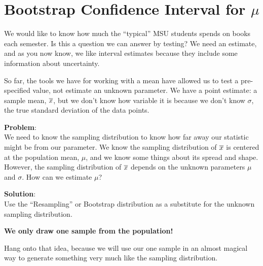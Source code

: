 \def\theTopic{Textbook Costs}
\def\dayNum{8 }

\section{Bootstrap  Confidence Interval for $\mu$}


We would like to know how much the ``typical'' MSU students spends on
books each semester.  Is this a question we can answer by testing?
  We need an estimate, and as you now know, we like interval
estimates because they include some information about uncertainty.

So far, the tools we have for working with a mean have allowed us to
test a pre-specified value, not estimate an unknown parameter.
We have a point estimate: a sample mean, $\overline{x}$, but we don't know how
variable it is because we don't know $\sigma$, the true standard
deviation of the data points. 

{\bf Problem}:\\
We need to know the sampling distribution to know how far away our
statistic might be from our parameter.  We know the sampling
distribution of $ \overline{x}$ is centered at the population mean, $\mu$, and
we know some things about its spread and shape.   However, the sampling
distribution  of $\overline{x}$ depends on the unknown parameters $\mu$ and $\sigma$. How
can we estimate $\mu$?  


{\bf Solution}:\\Use the ``Resampling'' or Bootstrap distribution as a
substitute for the unknown sampling distribution.
\vspace{-.2in}
\begin{center}
	{\bf\sf	We only draw {\bf one} sample from the population!}
\end{center}

Hang onto that idea, because we will use our one sample  in an almost
magical way to generate something very much like the sampling
distribution.   


